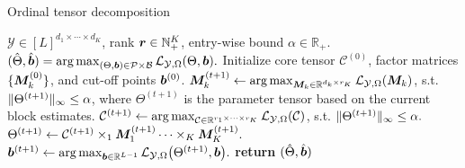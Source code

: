\documentclass{article}
\theoremstyle{plain}
\theoremstyle{definition}
\begin{document}
\begin{algorithm}[t]
        \caption{Ordinal tensor decomposition}\label{alg}
        \begin{algorithmic}[]
              
            $\mathcal{Y}\in [L]^{d_1\times\cdots\times d_K}$, rank $\bm{r}\in \mathbb{N}_{+}^{K}$, entry-wise bound $\alpha\in \mathbb{R_+}$.
             $(\hat\Theta,\hat{\bm{b}}) =  \operatorname*{arg\,max}_{(\Theta,\bm{b})\in \mathcal{P}\times\mathcal{B}}  \mathcal{L}_{\mathcal{Y},\Omega}(\Theta,\bm{b}).$
            \STATE Initialize core tensor $\mathcal{C}^{(0)}$, factor matrices $ \{\bm M_k^{(0)}\}$, and cut-off points $\bm{b}^{(0)}$.
            \STATE $\bm M_k^{(t+1)}\gets\operatorname*{arg\,max}_{\bm M_k\in\mathbb{R}^{d_k\times r_K}}\mathcal{L}_{\mathcal{Y},\Omega}(\bm M_k)$,
            \newline
             s.t. $\lVert\Theta^{(t+1)}\rVert_\infty\leq \alpha$, where $\Theta^{(t+1)}$ is the parameter tensor based on the current block estimates. 
            \ENDFOR
              \newline$\mathcal{C}^{(t+1)} \gets \operatorname*{arg\,max}_{\mathcal{C}\in \mathbb{R}^{r_1\times\cdots\times r_K}}\mathcal{L}_{\mathcal{Y},\Omega}(\mathcal{C})$, s.t. $\lVert\Theta^{(t+1)}\rVert_\infty\leq \alpha.$
                   \newline
                   $\Theta^{(t+1)} \gets \mathcal{C}^{(t+1)}\times_1\bm M_1^{(t+1)}\cdots\times_K\bm M_K^{(t+1)}.$
              \newline
              $\bm{b}^{(t+1)} \gets \operatorname*{arg\,max}_{\bm{b}\in \mathbb{R}^{L-1}}\mathcal{L}_{\mathcal{Y},\Omega}\big(\Theta^{(t+1)},\bm{b}\big).$
            \ENDFOR
            \STATE \textbf{return}
            $(\hat \Theta,\hat {\bm{b}})$
        \end{algorithmic}
 \end{algorithm}
\end{document}

